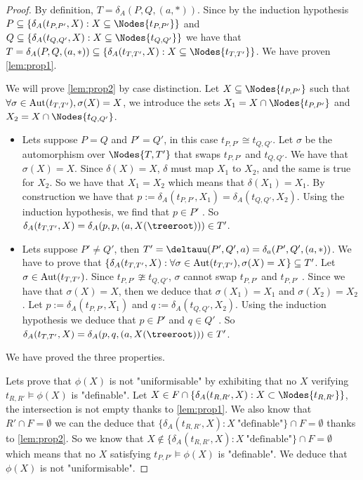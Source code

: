 \documentclass{article}
\begin{document}
\begin{proof}
	By definition, $T = \delta_A(P,Q,(a,*))$. Since by the induction hypothesis $P \subseteq \{ \delta_A (t_{P,P'},X) : X \subseteq \Nodes {t_{P,P'}}\}$
	and $Q \subseteq \{ \delta_A (t_{Q,Q'},X) : X \subseteq \Nodes {t_{Q,Q'}}\}$  we have that
	$T = \delta_A(P,Q,(a,*)) \subseteq \{ \delta_A (t_{T,T'},X) : X \subseteq \Nodes {t_{T,T'}}\}$. We have proven \ref{lem:prop1}.


	We will prove \ref{lem:prop2} by case distinction. 
    Let $X \subseteq \Nodes {t_{P,P'}}$ such that $\forall \sigma \in \text{Aut} (t_{T,T'}), \sigma(X) = X$, we introduce the
    sets $X_1 = X \cap \Nodes {t_{P,P'}}$ and $X_2 = X \cap \Nodes {t_{Q,Q'}}$. 
    \begin{itemize}
        \item Lets suppose $P = Q$ and $P' = Q'$, in this case $t_{P,P'} \cong t_{Q,Q'}$. 
            Let $\sigma$ be the automorphism over $\Nodes{T,T'}$ that swaps  $t_{P,P'}$ and $t_{Q,Q'}$.
            We have that $\sigma (X) = X$. Since $\delta(X) = X$, $\delta$ must map $X_1$ to $X_2$, and the same is true for 
            $X_2$. So we have that $X_1 = X_2$ which means that $\delta(X_1) = X_1$. By construction we have that $p := \delta_A(t_{P,P'}, X_1) =  \delta_A(t_{Q,Q'}, X_2)$.
            Using the induction hypothesis, we find that $p \in P'$ . So 
            $\delta_A (t_{T,T'}, X) = \delta_A(p,p,(a, X(\treeroot))) \in T'$. 

        \item Lets suppose $P' \neq Q'$, then $T' = \deltauu (P',Q',a) = \delta_a(P',Q',(a,*))$. We have to prove that
            $\{ \delta_A (t_{T,T'},X) : \forall \sigma \in \text{Aut}(t_{T,T'}), \sigma(X) = X\} \subseteq T'$. 
            Let $\sigma \in \text{Aut}(t_{T,T'})$. Since $t_{P,P'} \ncong t_{Q,Q'}$, $\sigma$ cannot swap $t_{P,P'}$ and
            $t_{P,P'}$ . Since we have that $\sigma(X) = X$, then we deduce that $\sigma(X_1) = X_1$ and 
            $\sigma(X_2) = X_2$ . Let $p := \delta_A (t_{P,P'}, X_1)$ and $q := \delta_A (t_{Q,Q'}, X_2)$.
            Using the induction hypothesis we deduce that $p \in P'$ and $q \in Q'$ .
            So $\delta_A (t_{T,T'}, X) = \delta_A(p,q,(a, X(\treeroot))) \in T'$.
    \end{itemize}
    We have proved the three properties.

	Lets prove that  $\phi(X)$ is not "uniformisable" by exhibiting that no $X$ verifying $t_{R,R'} \models \phi(X)$ is "definable".
    Let $X \in F \cap \{ \delta_A (t_{R,R'},X) : X \subset \Nodes {t_{R,R'}}\}$, the intersection is not empty thanks to \ref{lem:prop1}. 
	We also know that $R' \cap F = \emptyset$ we can the deduce that $\{ \delta_A (t_{R,R'},X) : X \ \text{"definable"}\} \cap F = \emptyset$
	thanks to \ref{lem:prop2}. So we know that $X \notin \{ \delta_A (t_{R,R'},X) : X \ \text{"definable"}\} \cap F = \emptyset$ which means that no
	$X$ satisfying $t_{P,P'} \models \phi(X)$ is "definable". We deduce that $\phi(X)$ is not "uniformisable".
\end{proof}


\iffalse
	
	
\fi
\end{document}
